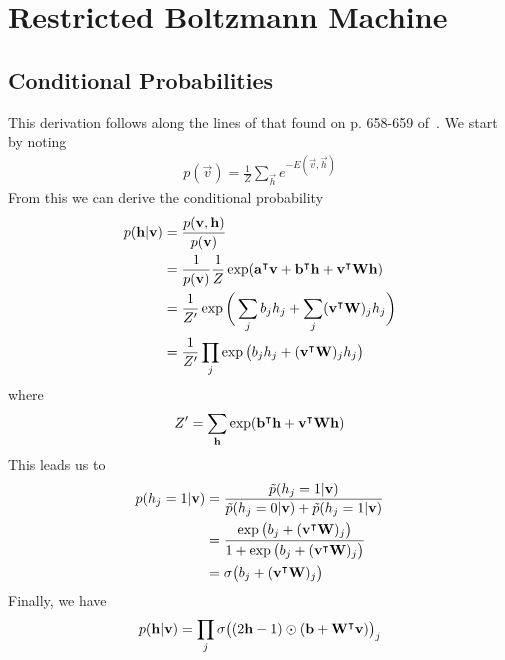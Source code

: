\section{Restricted Boltzmann Machine}
\subsection{Conditional Probabilities}\label{app:conditional_probabilities_derivation}
This derivation follows along the lines of that found on p. 658-659 of~\cite{goodfellow_deep_learning}.
We start by noting
\begin{align}
    p(\vec{v}) = \frac{1}{Z} \sum_\vec{h} e^{-E(\vec{v},\vec{h})}
\end{align}
From this we can derive the conditional probability
\begin{align}
\begin{split}
    p(\mathbf{h} | \mathbf{v})
        &= \frac{p(\mathbf{v},\mathbf{h})}{p(\mathbf{v})} \\
        &= \frac{1}{p(\mathbf{v})} \frac{1}{Z} \exp( \mathbf{a}^\intercal\mathbf{v} + \mathbf{b}^\intercal\mathbf{h} + \mathbf{v}^\intercal\mathbf{W}\mathbf{h} ) \\
        &= \frac{1}{Z'} \exp\bigg( \sum_j b_j h_j + \sum_j (\mathbf{v}^\intercal\mathbf{W})_j h_j \bigg) \\
        &= \frac{1}{Z'} \prod_j \exp\big( b_j h_j + (\mathbf{v}^\intercal\mathbf{W})_j h_j \big)
\end{split}
\end{align}
where
\begin{align}
    Z' = \sum_{\mathbf{h}} \exp( \mathbf{b}^\intercal\mathbf{h} + \mathbf{v}^\intercal\mathbf{W}\mathbf{h} )
\end{align}
This leads us to
\begin{align}
\begin{split}
    p(h_j = 1 | \mathbf{v})
        &= \frac{\tilde{p}(h_j = 1 | \mathbf{v})}{\tilde{p}(h_j = 0 | \mathbf{v}) + \tilde{p}(h_j = 1 | \mathbf{v})} \\
        &= \frac{\exp\big( b_j + (\mathbf{v}^\intercal\mathbf{W})_j \big)}{1 + \exp\big( b_j + (\mathbf{v}^\intercal\mathbf{W})_j \big)} \\
        &= \sigma\big( b_j + (\mathbf{v}^\intercal\mathbf{W})_j \big)
\end{split}
\end{align}
Finally, we have
\begin{align}
    p(\mathbf{h} | \mathbf{v}) = \prod_j \sigma\big( (2\mathbf{h} - 1) \odot (\mathbf{b} + \mathbf{W}^\intercal\mathbf{v}) \big)_j
\end{align}

